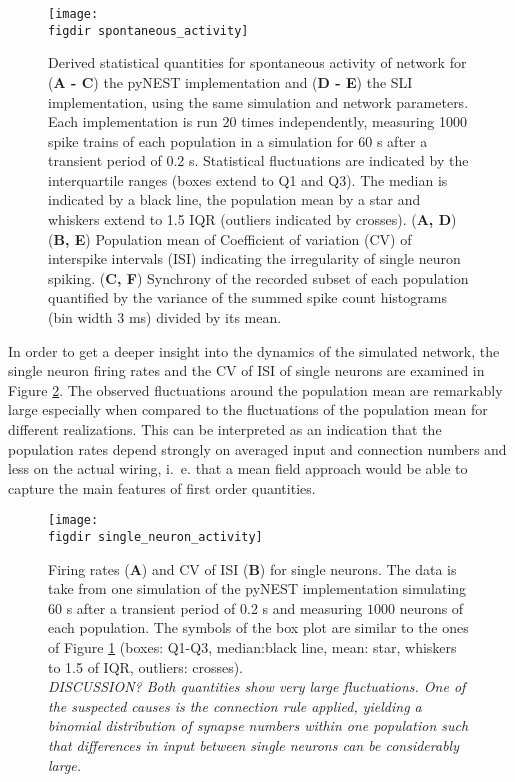 \begin{figure}[htpb]
    \centering
    \texttt{[image: \\figdir spontaneous\_activity]}
    \caption{
        Derived statistical quantities for spontaneous activity of network for
        (\textbf{A - C}) the pyNEST implementation and (\textbf{D - E}) the SLI implementation, 
        using the same simulation and network parameters.
        Each implementation is run $20$ times independently, 
        measuring 1000 spike trains of each population in a simulation for 60 s 
        after a transient period of 0.2 s. 
        Statistical fluctuations 
        are indicated by the interquartile ranges (boxes extend to Q1 and Q3). 
        The median is indicated by a black line, the population mean by a star and 
        whiskers extend to 1.5 IQR (outliers indicated by crosses). 
        \quad (\textbf{A, D}) 
        \quad (\textbf{B, E}) Population mean of Coefficient of variation (CV) of interspike intervals (ISI) indicating 
        the irregularity of single neuron spiking. 
        \quad (\textbf{C, F}) Synchrony of the recorded subset of each population quantified by the 
        variance of the summed spike count histograms (bin width 3 ms) divided by
        its mean. 
    }
    \label{fig:spontaneous_activity}
\end{figure}

In order to get a deeper insight into the dynamics of the simulated network, the single neuron firing 
rates and the CV of ISI of single neurons are examined in Figure \ref{fig:single_neuron_activity}.
The observed fluctuations around the population mean are remarkably large especially when compared 
to the fluctuations of the population mean for different realizations. This can be interpreted as 
an indication that the population rates depend strongly on averaged input and connection numbers
and less on the actual wiring, i.~e. that a mean field approach would be able to capture the main features 
of first order quantities. 
\begin{figure}[htpb]
    \centering
    \texttt{[image: \\figdir single\_neuron\_activity]}
    \caption{
        Firing rates (\textbf{A}) and CV of ISI (\textbf{B}) for single neurons. 
        The data is take from one simulation of the pyNEST implementation 
        simulating $60$ s after a transient period of 0.2 s and measuring 
        $1000$ neurons of each population. The symbols of the box plot 
        are similar to the ones of Figure \ref{fig:spontaneous_activity} 
        (boxes: Q1-Q3, median:black line, mean: star, 
        whiskers to 1.5 of IQR, outliers: crosses). 
        \\\emph{DISCUSSION?
        Both quantities show very large fluctuations. One of the suspected
        causes is the connection rule applied, yielding a binomial distribution 
        of synapse numbers within one population
        such that differences in input between single neurons can be 
    considerably large.}
    }
    \label{fig:single_neuron_activity}
\end{figure}

